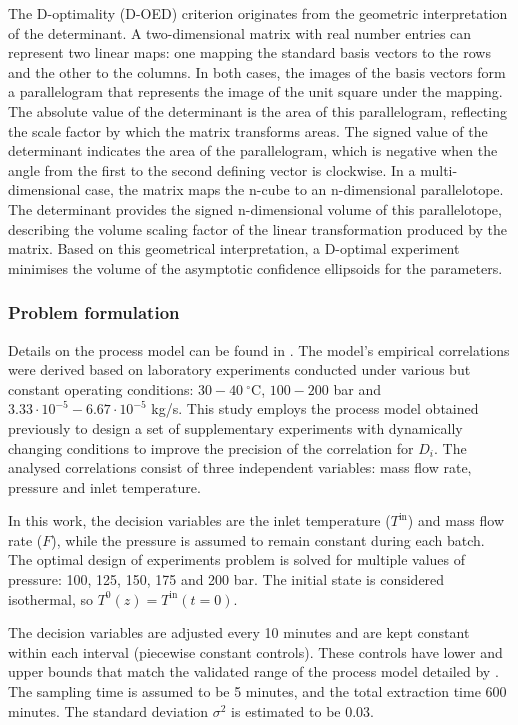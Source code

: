 \documentclass[a4paper,fleqn]{cas-dc}
\begin{document}
		The D-optimality (D-OED) criterion originates from the geometric interpretation of the determinant. A two-dimensional matrix with real number entries can represent two linear maps: one mapping the standard basis vectors to the rows and the other to the columns. In both cases, the images of the basis vectors form a parallelogram that represents the image of the unit square under the mapping. The absolute value of the determinant is the area of this parallelogram, reflecting the scale factor by which the matrix transforms areas. The signed value of the determinant indicates the area of the parallelogram, which is negative when the angle from the first to the second defining vector is clockwise. In a multi-dimensional case, the matrix maps the n-cube to an n-dimensional parallelotope. The determinant provides the signed n-dimensional volume of this parallelotope, describing the volume scaling factor of the linear transformation produced by the matrix. Based on this geometrical interpretation, a D-optimal experiment minimises the volume of the asymptotic confidence ellipsoids for the parameters.
		
		\subsubsection{Problem formulation}
		
		Details on the process model can be found in \citet{Sliczniuk2024}. The model's empirical correlations were derived based on laboratory experiments conducted under various but constant operating conditions: $30 - 40~^\circ\text{C}$, $100 - 200$ bar and $3.33 \cdot 10^{-5} - 6.67 \cdot 10^{-5}$ kg/s. This study employs the process model obtained previously to design a set of supplementary experiments with dynamically changing conditions to improve the precision of the correlation for $D_i$. The analysed correlations consist of three independent variables: mass flow rate, pressure and inlet temperature. 
		
		In this work, the decision variables are the inlet temperature ($T^{\text{in}}$) and mass flow rate ($F$), while the pressure is assumed to remain constant during each batch. The optimal design of experiments problem is solved for multiple values of pressure: 100, 125, 150, 175 and 200 bar. The initial state is considered isothermal, so $T^0(z) = T^{\text{in}}(t=0)$.
		
		The decision variables are adjusted every 10 minutes and are kept constant within each interval (piecewise constant controls). These controls have lower and upper bounds that match the validated range of the process model detailed by \citet{Sliczniuk2024}. The sampling time is assumed to be 5 minutes, and the total extraction time 600 minutes. The standard deviation $\sigma^2$ is estimated to be 0.03.
		
\end{document}
